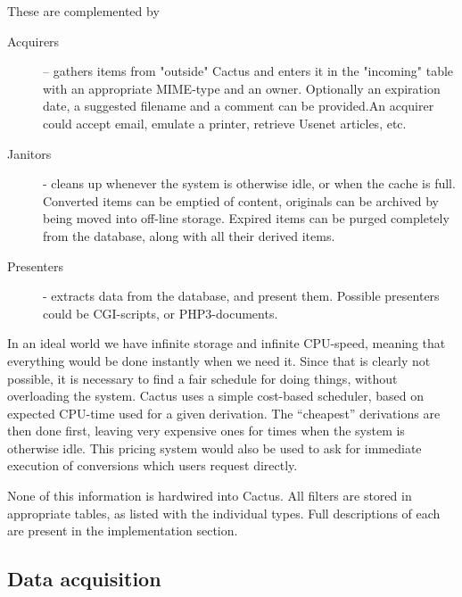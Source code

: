These are complemented by

\begin{description}
\item[Acquirers] -- gathers items from "outside" Cactus and
  enters it in the "incoming" table with an appropriate
  MIME-type and an owner.  Optionally an expiration date, a
  suggested filename and a comment can be provided.An
  acquirer could accept email, emulate a printer, retrieve
  Usenet articles, etc.
  
\item[Janitors] - cleans up whenever the system is otherwise
  idle, or when the cache is full.  Converted items can be
  emptied of content, originals can be archived by being
  moved into off-line storage.  Expired items can be purged
  completely from the database, along with all their derived
  items.
  
\item[Presenters] - extracts data from the database, and
  present them.  Possible presenters could be CGI-scripts,
  or  PHP3-documents.  
  
\end{description}

In an ideal world we have infinite storage and infinite
CPU-speed, meaning that everything would be done instantly
when we need it.  Since that is clearly not possible, it is
necessary to find a fair schedule for doing things, without
overloading the system.  Cactus uses a simple cost-based
scheduler, based on expected CPU-time used for a given
derivation.  The ``cheapest'' derivations are then done
first, leaving very expensive ones for times when the system
is otherwise idle.  This pricing system would also be used
to ask for immediate execution of conversions which users
request directly.


None of this information is hardwired into Cactus.  All
filters are stored in appropriate tables, as listed with the
individual types.  Full descriptions of each are present in
the implementation section.

\subsection{Data acquisition}

